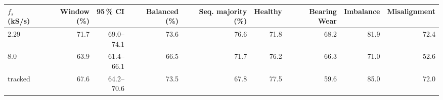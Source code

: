 \begin{tabular}{@{}lrrrrrrrr@{}}
\toprule
$f_s$ (kS/s) & Window (\%) & 95\,\% CI & Balanced (\%) & Seq. majority (\%) & Healthy & Bearing Wear & Imbalance & Misalignment \\
\midrule
2.29 & 71.7 & 69.0--74.1 & 73.6 & 76.6 & 71.8 & 68.2 & 81.9 & 72.4 \\
8.0 & 63.9 & 61.4--66.1 & 66.5 & 71.7 & 76.2 & 66.3 & 71.0 & 52.6 \\
tracked & 67.6 & 64.2--70.6 & 73.5 & 67.8 & 77.5 & 59.6 & 85.0 & 72.0 \\
\bottomrule
\end{tabular}

